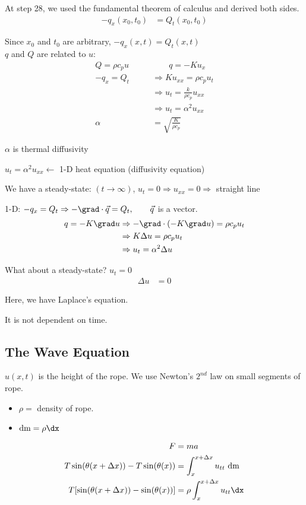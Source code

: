 At step 28, we used the fundamental theorem of calculus and derived both sides.
%
\begin{align}
  -q_x(x_0, t_0) & = Q_t(x_0, t_0)
\end{align}

Since $x_0$ and $t_0$ are arbitrary, $-q_x(x, t) = Q_t(x, t)$\\
$q$ and $Q$ are related to $u$:
%
\begin{align}
  Q = \rho c_p u \qquad & \qquad q = -Ku_x\\
  -q_x = Q_t & \Rightarrow Ku_{xx} = \rho c_p u_t\\
  & \Rightarrow u_t = \frac{k}{\rho c_p} u_{xx}\\
  & \Rightarrow u_t = \alpha^2 u_{xx}\\
  \alpha & = \sqrt{\frac{K}{\rho c_p}}
\end{align}

$\alpha$ is thermal diffusivity

$u_t = \alpha^2 u_{xx} \leftarrow$ 1-D heat equation (diffusivity equation)

We have a steady-state:
$(t \rightarrow \infty)$, $u_t = 0 \Rightarrow u_{xx} = 0 \Rightarrow$ straight line

1-D: $-q_x = Q_t \Rightarrow -\grad \cdot \vec q = Q_t, \qquad \vec q$ is a vector.
%
\begin{align}
  q = -K \grad u & \Rightarrow - \grad \cdot (-K \grad u) = \rho c_p u_t\\
  & \Rightarrow K \Delta u = \rho c_p u_t\\
  & \Rightarrow u_t = \alpha^2 \Delta u
\end{align}

What about a steady-state? $u_t = 0$
%
\begin{align}
  \Delta u & = 0
\end{align}

Here, we have Laplace's equation.

\note It is not dependent on time.

\subsection{The Wave Equation}

$u(x, t)$ is the height of the rope.
We use Newton's $2^{nd}$ law on small segments of rope.
%
\begin{itemize}
  \item $\rho = $ density of rope.
  \item $\text{dm} = \rho \dx$
\end{itemize}
\begin{align}
  F & = ma\\
  T \sin(\theta(x + \Delta x)) - T \sin(\theta(x)) & = \int^{x + \Delta x}_x u_{tt} \text{ dm}\\
  T[ \sin(\theta (x + \Delta x)) - \sin(\theta (x))] & = \rho \int^{x + \Delta x}_{x} u_{tt} \dx
\end{align}

